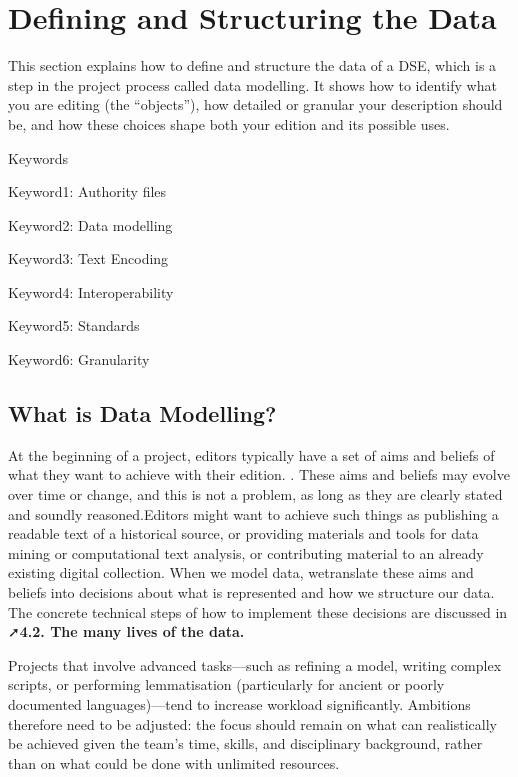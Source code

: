 \documentclass[
  letterpaper,
  DIV=11,
  numbers=noendperiod]{scrreprt}
\begin{document}
\section{Defining and Structuring the
Data}\label{defining-and-structuring-the-data}

This section explains how to define and structure the data of a DSE,
which is a step in the project process called data modelling. It shows
how to identify what you are editing (the ``objects''), how detailed or
granular your description should be, and how these choices shape both
your edition and its possible uses.

Keywords

Keyword1: Authority files

Keyword2: Data modelling

Keyword3: Text Encoding

Keyword4: Interoperability

Keyword5: Standards

Keyword6: Granularity

\subsection{What is Data Modelling?}\label{what-is-data-modelling}

At the beginning of a project, editors typically have a set of aims and
beliefs of what they want to achieve with their edition. . These aims
and beliefs may evolve over time or change, and this is not a problem,
as long as they are clearly stated and soundly reasoned.Editors might
want to achieve such things as publishing a readable text of a
historical source, or providing materials and tools for data mining or
computational text analysis, or contributing material to an already
existing digital collection. When we model data, wetranslate these aims
and beliefs into decisions about what is represented and how we
structure our data. The concrete technical steps of how to implement
these decisions are discussed in ➚\textbf{4.2. The many lives of the
data.}

Projects that involve advanced tasks---such as refining a model, writing
complex scripts, or performing lemmatisation (particularly for ancient
or poorly documented languages)---tend to increase workload
significantly. Ambitions therefore need to be adjusted: the focus should
remain on what can realistically be achieved given the team's time,
skills, and disciplinary background, rather than on what could be done
with unlimited resources.
\end{document}
